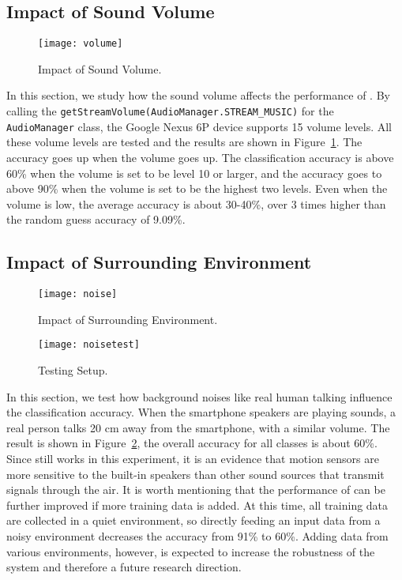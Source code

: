 \subsection{Impact of Sound Volume}\label{sec:impact:volume}
\begin{figure}[!h]
	\centering
	\texttt{[image: volume]}
	\caption{Impact of Sound Volume.}
	\label{fig:volume}
\end{figure}


In this section, we study how the sound volume affects the performance of {\systemName}. 
%
By calling the \verb|getStreamVolume(AudioManager.STREAM_MUSIC)| for the \verb|AudioManager| class, the Google Nexus 6P device supports 15 volume levels. All these volume levels are tested and the results are shown in Figure~\ref{fig:volume}. 
%
The accuracy goes up when the volume goes up. The classification accuracy is above 60\% when the volume is set to be level 10 or larger, and the accuracy goes to above 90\% when the volume is set to be the highest two levels. Even when the volume is low, the average accuracy is about 30-40\%, over 3 times higher than the random guess accuracy of 9.09\%.


\subsection{Impact of Surrounding Environment}\label{sec:impact:noise}

\begin{figure}[ht]
	\centering
	\texttt{[image: noise]}
	\caption{Impact of Surrounding Environment.}
	\label{fig:noise}
\end{figure}

\begin{figure}[!h]
	\centering
	\texttt{[image: noisetest]}
	\caption{Testing Setup.}
	\label{fig:noisetest}
\end{figure}

In this section, we test how background noises like real human talking influence the classification accuracy. When the smartphone speakers are playing sounds, a real person talks 20 cm away from the smartphone, with a similar volume. The result is shown in Figure~\ref{fig:noise}, the overall accuracy for all classes is about 60\%. Since {\systemName} still works in this experiment, it is an evidence that motion sensors are more sensitive to the built-in speakers than other sound sources that transmit signals through the air. 
%
It is worth mentioning that the performance of {\systemName} can be further improved if more training data is added. At this time, all training data are collected in a quiet environment, so directly feeding an input data from a noisy environment decreases the accuracy from 91\% to 60\%. Adding data from various environments, however, is expected to increase the robustness of the system and therefore a future research direction. 



